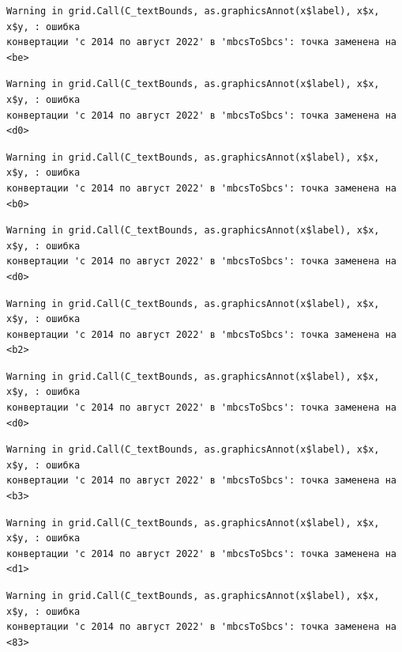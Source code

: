 \documentclass[
  letterpaper,
  DIV=11,
  numbers=noendperiod]{scrreprt}
\begin{document}
\begin{verbatim}
Warning in grid.Call(C_textBounds, as.graphicsAnnot(x$label), x$x, x$y, : ошибка
конвертации 'с 2014 по август 2022' в 'mbcsToSbcs': точка заменена на <be>
\end{verbatim}

\begin{verbatim}
Warning in grid.Call(C_textBounds, as.graphicsAnnot(x$label), x$x, x$y, : ошибка
конвертации 'с 2014 по август 2022' в 'mbcsToSbcs': точка заменена на <d0>
\end{verbatim}

\begin{verbatim}
Warning in grid.Call(C_textBounds, as.graphicsAnnot(x$label), x$x, x$y, : ошибка
конвертации 'с 2014 по август 2022' в 'mbcsToSbcs': точка заменена на <b0>
\end{verbatim}

\begin{verbatim}
Warning in grid.Call(C_textBounds, as.graphicsAnnot(x$label), x$x, x$y, : ошибка
конвертации 'с 2014 по август 2022' в 'mbcsToSbcs': точка заменена на <d0>
\end{verbatim}

\begin{verbatim}
Warning in grid.Call(C_textBounds, as.graphicsAnnot(x$label), x$x, x$y, : ошибка
конвертации 'с 2014 по август 2022' в 'mbcsToSbcs': точка заменена на <b2>
\end{verbatim}

\begin{verbatim}
Warning in grid.Call(C_textBounds, as.graphicsAnnot(x$label), x$x, x$y, : ошибка
конвертации 'с 2014 по август 2022' в 'mbcsToSbcs': точка заменена на <d0>
\end{verbatim}

\begin{verbatim}
Warning in grid.Call(C_textBounds, as.graphicsAnnot(x$label), x$x, x$y, : ошибка
конвертации 'с 2014 по август 2022' в 'mbcsToSbcs': точка заменена на <b3>
\end{verbatim}

\begin{verbatim}
Warning in grid.Call(C_textBounds, as.graphicsAnnot(x$label), x$x, x$y, : ошибка
конвертации 'с 2014 по август 2022' в 'mbcsToSbcs': точка заменена на <d1>
\end{verbatim}

\begin{verbatim}
Warning in grid.Call(C_textBounds, as.graphicsAnnot(x$label), x$x, x$y, : ошибка
конвертации 'с 2014 по август 2022' в 'mbcsToSbcs': точка заменена на <83>
\end{verbatim}
\end{document}

